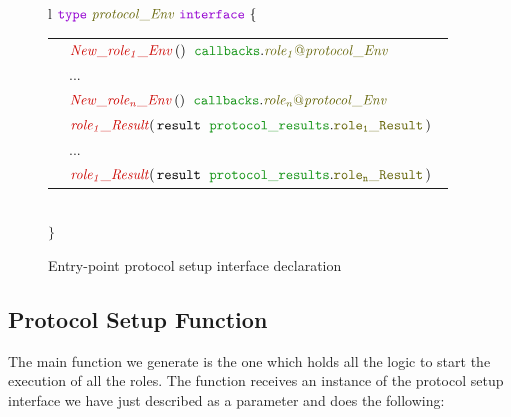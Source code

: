 \documentclass[12pt,twoside]{report}
\begin{document}
\begin{figure}[!h]
    \begin{center}
        \begin{tabular}{l}
            $\gotype\ \interfacename{protocol\_Env}\ \gointerface\ \{$ \\[3pt]
            \begin{tabular}{ll}
                \indent & $\functionname{New\_role_1\_Env}\,()\;\ \pkginterfaceaccess{callbacks}{role_1@protocol\_Env}$\\[3.5pt]
                \indent & ...\\[3.5pt]
                \indent & $\functionname{New\_role_n\_Env}\,()\;\ \pkginterfaceaccess{callbacks}{role_n@protocol\_Env}$\\[10pt]
                \indent & $\functionname{role_1\_Result}(\,\varname{result}\ \;\pkgstructaccess{protocol\_results}{role_1\_Result}\,)\;\ $\\[3.5pt]
                \indent & ...\\[3.5pt]
                \indent & $\functionname{role_1\_Result}(\,\varname{result}\ \;\pkgstructaccess{protocol\_results}{role_n\_Result}\,)\;\ $\\[3.5pt]
            \end{tabular}\\[3pt]
            $\}$
        \end{tabular}

    \end{center}
    \caption{Entry-point protocol setup interface declaration}
    \label{setup-interface-gen}
\end{figure}

\subsection{Protocol Setup Function}\label{entry-point-setup-function}

The main function we generate is the one which holds all the logic to start the execution of all the roles. The function receives an instance of the protocol setup interface we have just described as a parameter and does the following:
\end{document}
